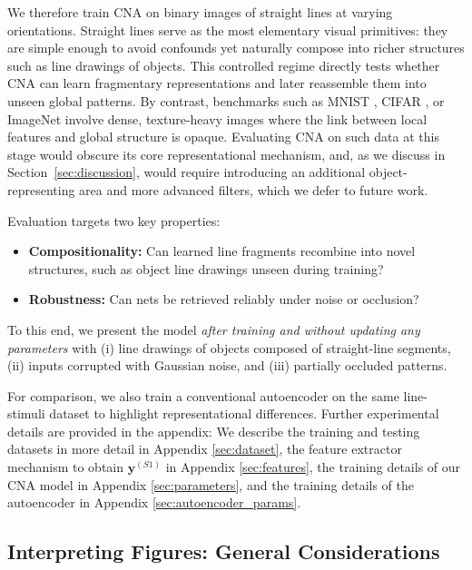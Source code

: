 \documentclass[12pt]{article}
\begin{document}
We therefore train CNA on binary images of straight lines at varying orientations. Straight lines serve as the most elementary visual primitives: they are simple enough to avoid confounds yet naturally compose into richer structures such as line drawings of objects. This controlled regime directly tests whether CNA can learn fragmentary representations and later reassemble them into unseen global patterns. By contrast, benchmarks such as MNIST \cite{lecun1998gradient}, CIFAR \cite{krizhevsky2009cifar}, or ImageNet \cite{Deng_2009} involve dense, texture-heavy images where the link between local features and global structure is opaque. Evaluating CNA on such data at this stage would obscure its core representational mechanism, and, as we discuss in Section~\ref{sec:discussion}, would require introducing an additional object-representing area and more advanced filters, which we defer to future work.

Evaluation targets two key properties:
\begin{itemize}
    \item \textbf{Compositionality:} Can learned line fragments recombine into novel structures, such as object line drawings unseen during training?
    \item \textbf{Robustness:} Can nets be retrieved reliably under noise or occlusion?
\end{itemize}
To this end, we present the model \emph{after training and without updating any parameters} with (i) line drawings of objects composed of straight-line segments, (ii) inputs corrupted with Gaussian noise, and (iii) partially occluded patterns.

For comparison, we also train a conventional autoencoder on the same line-stimuli dataset to highlight representational differences. Further experimental details are provided in the appendix: We describe the training and testing datasets in more detail in Appendix \ref{sec:dataset}, the feature extractor mechanism to obtain $\boldsymbol{y}^{(S1)}$ in Appendix \ref{sec:features}, the training details of our CNA model in Appendix \ref{sec:parameters}, and the training details of the autoencoder in Appendix \ref{sec:autoencoder_params}.


\subsection{Interpreting Figures: General Considerations}
\end{document}

